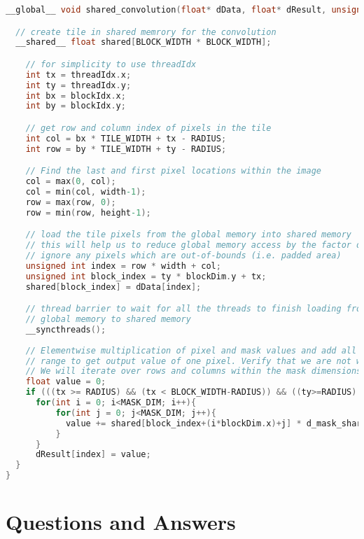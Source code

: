 \begin{lstlisting}[language=C, label={lst: shared_convolution}, caption= 2D Convolution using the shared memory]
__global__ void shared_convolution(float* dData, float* dResult, unsigned int width, unsigned int height){

  // create tile in shared memrory for the convolution
  __shared__ float shared[BLOCK_WIDTH * BLOCK_WIDTH];

    // for simplicity to use threadIdx
    int tx = threadIdx.x;
    int ty = threadIdx.y;
    int bx = blockIdx.x;
    int by = blockIdx.y;

    // get row and column index of pixels in the tile
    int col = bx * TILE_WIDTH + tx - RADIUS;
    int row = by * TILE_WIDTH + ty - RADIUS;

    // Find the last and first pixel locations within the image
    col = max(0, col);
    col = min(col, width-1);
    row = max(row, 0);
    row = min(row, height-1);

    // load the tile pixels from the global memory into shared memory
    // this will help us to reduce global memory access by the factor of 1/TILE_WIDTH
    // ignore any pixels which are out-of-bounds (i.e. padded area)
    unsigned int index = row * width + col;
    unsigned int block_index = ty * blockDim.y + tx;
    shared[block_index] = dData[index];

    // thread barrier to wait for all the threads to finish loading from
    // global memory to shared memory
    __syncthreads();
  
    // Elementwise multiplication of pixel and mask values and add all of the values within the mask
    // range to get output value of one pixel. Verify that we are not working out-of-bounds of the image
    // We will iterate over rows and columns within the mask dimensions (i.e. all the neighbours)
    float value = 0;
    if (((tx >= RADIUS) && (tx < BLOCK_WIDTH-RADIUS)) && ((ty>=RADIUS) && (ty<=BLOCK_WIDTH-RADIUS))){
      for(int i = 0; i<MASK_DIM; i++){
          for(int j = 0; j<MASK_DIM; j++){ 
            value += shared[block_index+(i*blockDim.x)+j] * d_mask_shared[i*3+j];
          }
      }
      dResult[index] = value;
  }
}\end{lstlisting}


\section{Questions and Answers}



